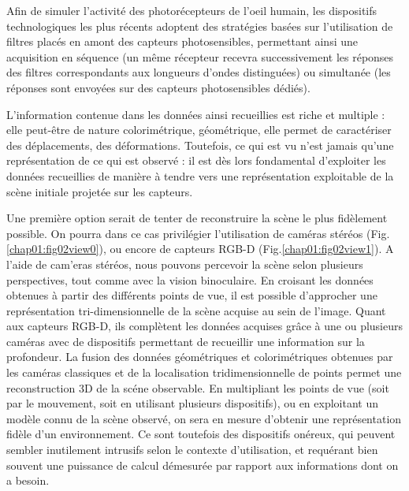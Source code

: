 Afin de simuler l'activité des photorécepteurs de l'oeil humain, les 
dispositifs technologiques les plus récents adoptent des stratégies basées sur 
l'utilisation de filtres placés en amont des capteurs photosensibles, 
permettant 
ainsi une acquisition en séquence (un même récepteur recevra successivement les 
réponses des filtres correspondants aux longueurs d'ondes distinguées) ou 
simultanée (les réponses sont envoyées sur des capteurs photosensibles dédiés).
  
L'information contenue dans les données ainsi recueillies est riche et multiple 
: elle peut-être de nature colorimétrique, géométrique, elle permet de 
ca\-ractériser des déplacements, des déformations. Toutefois, ce qui est vu 
n'est jamais qu'une représentation de ce qui est observé : il est d\`es lors 
fondamental d'exploiter les donn\'ees recueillies de mani\`ere \`a tendre 
vers une repr\'esentation exploitable de la scène initiale projetée sur les 
capteurs.

Une premi\`ere option serait de tenter de reconstruire la sc\`ene le plus 
fid\`element possible. On pourra dans ce cas privil\'egier l'utilisation de 
cam\'eras st\'er\'eos (Fig.\ref{chap01:fig02view0})\cite{brandou2006}, ou 
encore de capteurs RGB-D (Fig.\ref{chap01:fig02view1})\cite{siradjuddin2012}. A 
l'aide de cam'eras st\'er\'eos, nous pouvons percevoir la sc\`ene selon 
plusieurs perspectives, tout comme avec la vision binoculaire. En croisant les 
donn\'ees obtenues \`a partir des diff\'erents points de vue, il est possible 
d'approcher une repr\'esentation tri-dimensionnelle de la sc\`ene acquise au 
sein de l'image. Quant aux capteurs RGB-D, ils compl\`etent les donn\'ees 
acquises gr\^ace \`a une ou plusieurs cam\'eras avec de dispositifs permettant 
de recueillir une information sur la profondeur. La fusion des donn\'ees 
g\'eom\'etriques et colorim\'etriques obtenues par les cam\'eras classiques et 
de la localisation tridimensionnelle de points permet une reconstruction 3D de 
la sc\'ene observable. En multipliant les points de vue (soit par le mouvement, 
soit en utilisant plusieurs dispositifs), ou en exploitant un mod\`ele connu de 
la sc\`ene observ\'e, on sera en mesure d'obtenir une repr\'esentation fid\`ele 
d'un environnement. Ce sont toutefois des dispositifs on\'ereux, qui peuvent 
sembler inutilement intrusifs selon le contexte d'utilisation, et requ\'erant 
bien souvent une puissance de calcul d\'emesur\'ee par rapport aux informations 
dont on a besoin.

